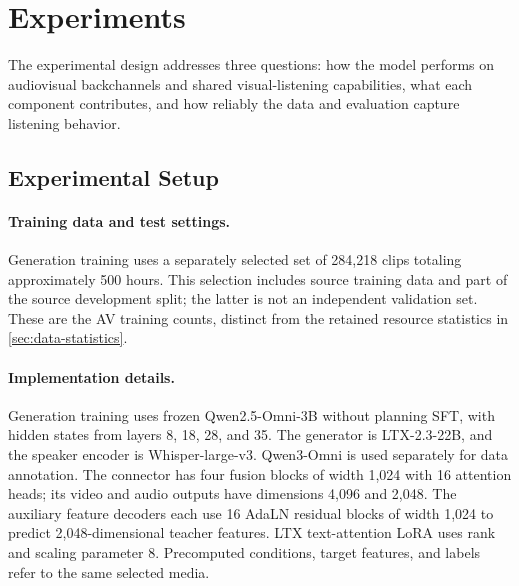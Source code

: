 \section{Experiments}
\label{sec:experiments}

The experimental design addresses three questions: how the model performs on audiovisual backchannels and shared visual-listening capabilities, what each component contributes, and how reliably the data and evaluation capture listening behavior.

\subsection{Experimental Setup}
\label{sec:setup}
\paragraph{Training data and test settings.}
Generation training uses a separately selected set of 284,218 clips totaling approximately 500 hours. This selection includes source training data and part of the source development split; the latter is not an independent validation set. These are the AV training counts, distinct from the retained resource statistics in \cref{sec:data-statistics}.

\paragraph{Implementation details.}
Generation training uses frozen Qwen2.5-Omni-3B without planning SFT, with hidden states from layers 8, 18, 28, and 35. The generator is LTX-2.3-22B, and the speaker encoder is Whisper-large-v3. Qwen3-Omni is used separately for data annotation. The connector has four fusion blocks of width 1,024 with 16 attention heads; its video and audio outputs have dimensions 4,096 and 2,048. The auxiliary feature decoders each use 16 AdaLN residual blocks of width 1,024 to predict 2,048-dimensional teacher features. LTX text-attention LoRA uses rank and scaling parameter 8. Precomputed conditions, target features, and labels refer to the same selected media.

